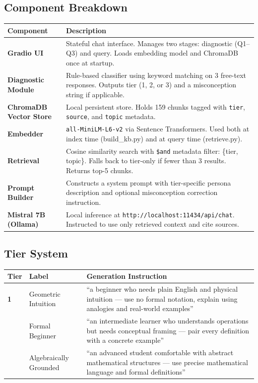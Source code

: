 \documentclass[11pt]{article}
\begin{document}
\subsection{Component Breakdown}

\begin{tabular}{>{\bfseries}p{3.8cm} p{9.5cm}}
\toprule
Component & Description \\
\midrule
Gradio UI & Stateful chat interface. Manages two stages: diagnostic (Q1--Q3) and query. Loads embedding model and ChromaDB once at startup. \\
\addlinespace
Diagnostic Module & Rule-based classifier using keyword matching on 3 free-text responses. Outputs tier (1, 2, or 3) and a misconception string if applicable. \\
\addlinespace
ChromaDB Vector Store & Local persistent store. Holds 159 chunks tagged with \texttt{tier}, \texttt{source}, and \texttt{topic} metadata. \\
\addlinespace
Embedder & \texttt{all-MiniLM-L6-v2} via Sentence Transformers. Used both at index time (build\_kb.py) and at query time (retrieve.py). \\
\addlinespace
Retrieval & Cosine similarity search with \texttt{\$and} metadata filter: \{tier, topic\}. Falls back to tier-only if fewer than 3 results. Returns top-5 chunks. \\
\addlinespace
Prompt Builder & Constructs a system prompt with tier-specific persona description and optional misconception correction instruction. \\
\addlinespace
Mistral 7B (Ollama) & Local inference at \texttt{http://localhost:11434/api/chat}. Instructed to use only retrieved context and cite sources. \\
\bottomrule
\end{tabular}

\subsection{Tier System}

\begin{tabular}{>{\bfseries}p{1.2cm} p{4.2cm} p{7cm}}
\toprule
Tier & Label & Generation Instruction \\
\midrule
1 & Geometric Intuition & ``a beginner who needs plain English and physical intuition --- use no formal notation, explain using analogies and real-world examples'' \\
\addlinespace
2 & Formal Beginner & ``an intermediate learner who understands operations but needs conceptual framing --- pair every definition with a concrete example'' \\
\addlinespace
3 & Algebraically Grounded & ``an advanced student comfortable with abstract mathematical structures --- use precise mathematical language and formal definitions'' \\
\bottomrule
\end{tabular}
\end{document}
